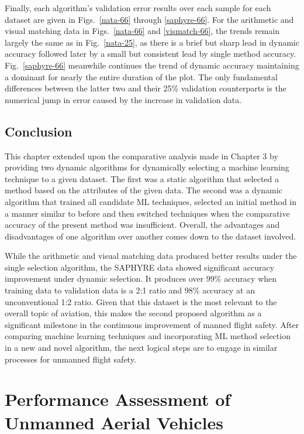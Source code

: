 \documentclass[12pt]{uthesis-v12}  %
\begin{document}
Finally, each algorithm's validation error results over each sample for each dataset are given in Figs.~\ref{nata-66} through \ref{saphyre-66}. For the arithmetic and visual matching data in Figs.~\ref{nata-66} and \ref{vismatch-66}, the trends remain largely the same as in Fig.~\ref{nata-25}, as there is a brief but sharp lead in dynamic accuracy followed later by a small but consistent lead by single method accuracy. Fig.~\ref{saphyre-66} meanwhile continues the trend of dynamic accuracy maintaining a dominant for nearly the entire duration of the plot. The only fundamental differences between the latter two and their 25\% validation counterparts is the numerical jump in error caused by the increase in validation data.

\section{Conclusion}

This chapter extended upon the comparative analysis made in Chapter 3 by providing two dynamic algorithms for dynamically selecting a machine learning technique to a given dataset. The first was a static algorithm that selected a method based on the attributes of the given data. The second was a dynamic algorithm that trained all candidate ML techniques, selected an initial method in a manner similar to before and then switched techniques when the comparative accuracy of the present method was insufficient. Overall, the advantages and disadvantages of one algorithm over another comes down to the dataset involved. 

While the arithmetic and visual matching data produced better results under the single selection algorithm, the SAPHYRE data showed significant accuracy improvement under dynamic selection. It produces over 99\% accuracy when training data to validation data is a 2:1 ratio and 98\% accuracy at an unconventional 1:2 ratio. Given that this dataset is the most relevant to the overall topic of aviation, this makes the second proposed algorithm as a significant milestone in the continuous improvement of manned flight safety. After comparing machine learning techniques and incorporating ML method selection in a new and novel algorithm, the next logical steps are to engage in similar processes for unmanned flight safety.

\chapter{Performance Assessment of Unmanned Aerial Vehicles}
\end{document}
